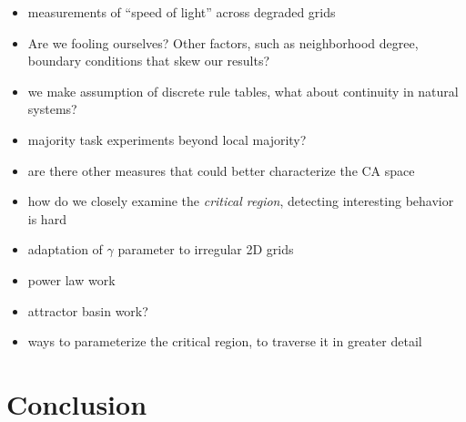 \documentclass[a4paper,11pt]{report}
\begin{document}
\begin{itemize}

\item measurements of ``speed of light'' across degraded grids
\item Are we fooling ourselves? Other factors, such as neighborhood degree, boundary conditions that skew our results?

\item we make assumption of discrete rule tables, what about continuity in natural systems?

\item majority task experiments beyond local majority?

\item are there other measures that could better characterize the CA space
\item how do we closely examine the \textit{critical region}, detecting interesting behavior is hard
\item adaptation of $\gamma$ parameter to irregular 2D grids
\item power law work
\item attractor basin work?
\item ways to parameterize the critical region, to traverse it in greater detail

\end{itemize}

\chapter{Conclusion}
\label{ch:conclusion}
\end{document}
